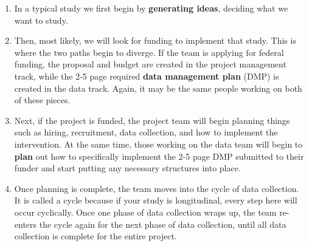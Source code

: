 \documentclass[
]{book}
\providecommand{\tightlist}{%
  \setlength{\itemsep}{0pt}\setlength{\parskip}{0pt}}
\begin{document}
\begin{enumerate}
\def\labelenumi{\arabic{enumi}.}
\tightlist
\item
  In a typical study we first begin by \textbf{generating ideas}, deciding what we want to study.
\item
  Then, most likely, we will look for funding to implement that study. This is where the two paths begin to diverge. If the team is applying for federal funding, the proposal and budget are created in the project management track, while the 2-5 page required \textbf{data management plan} (DMP) is created in the data track. Again, it may be the same people working on both of these pieces.
\item
  Next, if the project is funded, the project team will begin planning things such as hiring, recruitment, data collection, and how to implement the intervention. At the same time, those working on the data team will begin to \textbf{plan} out how to specifically implement the 2-5 page DMP submitted to their funder and start putting any necessary structures into place.
\item
  Once planning is complete, the team moves into the cycle of data collection. It is called a cycle because if your study is longitudinal, every step here will occur cyclically. Once one phase of data collection wraps up, the team re-enters the cycle again for the next phase of data collection, until all data collection is complete for the entire project.


\end{enumerate}
\end{document}
